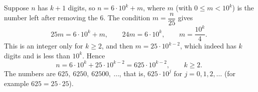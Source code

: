 Suppose $n$ has $k+1$ digits, so $n=6\cdot10^k+m$, where $m$ (with $0\le m<10^k$) is the number left after removing the $6$. The condition $m=\dfrac {n}{25}$ gives
\[25m=6\cdot10^k+m,\qquad 24m=6\cdot10^k,\qquad m=\dfrac{10^k}{4}.\]
This is an integer only for $k\ge2$, and then $m=25\cdot10^{k-2}$, which indeed has $k$ digits and is less than $10^k$. Hence
\[n=6\cdot10^k+25\cdot10^{k-2}=625\cdot10^{k-2},\qquad k\ge2 .\]
The numbers are $\boxed{625,\ 6250,\ 62500,\ \dots}$, that is, $625\cdot10^j$ for $j=0,1,2,\dots$ (for example $625=25\cdot25$).
